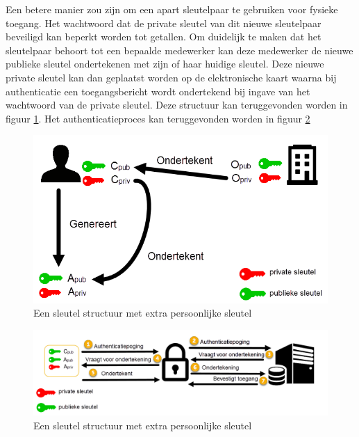 Een betere manier zou zijn om een apart sleutelpaar te gebruiken voor fysieke
toegang. Het wachtwoord dat de private sleutel van dit nieuwe sleutelpaar
beveiligd kan beperkt worden tot getallen. Om duidelijk te maken dat het
sleutelpaar behoort tot een bepaalde medewerker kan deze medewerker de nieuwe
publieke sleutel ondertekenen met zijn of haar huidige sleutel. Deze nieuwe
private sleutel kan dan geplaatst worden op de elektronische kaart waarna bij
authenticatie een toegangsbericht wordt ondertekend bij ingave van het
wachtwoord van de private sleutel. Deze structuur kan teruggevonden worden in
figuur \ref{fig:physical-security-key-structure}. Het authenticatieproces kan
teruggevonden worden in figuur \ref{fig:physical-security-auth-proces}

\begin{figure}[H]
	\includegraphics[width=\textwidth,keepaspectratio]{img/physical-security-key-diagram.png}
	\centering
	\caption{Een sleutel structuur met extra persoonlijke sleutel}
	\label{fig:physical-security-key-structure}
\end{figure}

\begin{figure}[H]
	\includegraphics[width=\textwidth,keepaspectratio]{img/physical-security-auth-process.png}
	\centering
	\caption{Een sleutel structuur met extra persoonlijke sleutel}
	\label{fig:physical-security-auth-proces}
\end{figure}

